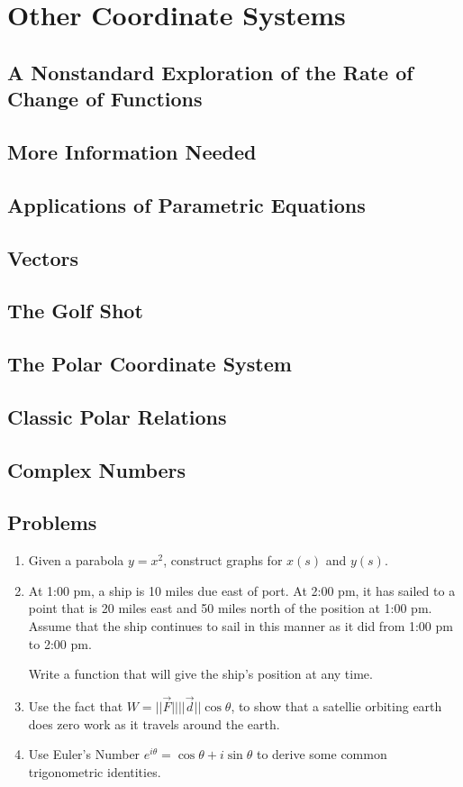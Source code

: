 \documentclass[../precalc.tex]{subfiles}
\begin{document}
\chapter{Other Coordinate Systems}
\section{A Nonstandard Exploration of the Rate of Change of Functions}
\section{More Information Needed}
\section{Applications of Parametric Equations}
\section{Vectors}
\section{The Golf Shot}
\section{The Polar Coordinate System}
\section{Classic Polar Relations}
\section{Complex Numbers}

\section*{Problems}
\begin{enumerate}
    \item Given a parabola $y=x^2$, construct graphs for $x(s)$ and $y(s)$.
    \item At 1:00 pm, a ship is 10 miles due east of port. At 2:00 pm, it has sailed to a point that is 20 miles east and 50 miles north of the position at 1:00 pm. Assume that the ship continues to sail in this manner as it did from 1:00 pm to 2:00 pm.
    
    Write a function that will give the ship's position at any time.
    \item Use the fact that $W=||\vec{F}|| ||\vec{d}||\cos\theta$, to show that a satellie orbiting earth does zero work as it travels around the earth.
    \item Use Euler's Number $e^{i\theta}=\cos\theta + i\sin\theta$ to derive some common trigonometric identities.
\end{enumerate}
\end{document}
